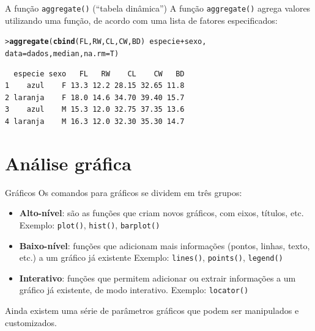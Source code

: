 \documentclass[10pt]{beamer}\usepackage{graphicx, color}
\makeatletter
\newcommand{\hlfunctioncall}[1]{\textcolor[rgb]{0,0,0.545098039215686}{\textbf{#1}}}%
\newenvironment{kframe}{%
 \def\at@end@of@kframe{}%
 \ifinner\ifhmode%
  \def\at@end@of@kframe{\end{minipage}}%
  \begin{minipage}{\columnwidth}%
 \fi\fi%
 \def\FrameCommand##1{\hskip\@totalleftmargin \hskip-\fboxsep
 \colorbox{shadecolor}{##1}\hskip-\fboxsep
     \hskip-\linewidth \hskip-\@totalleftmargin \hskip\columnwidth}%
 \MakeFramed {\advance\hsize-\width
   \@totalleftmargin\z@ \linewidth\hsize
   \@setminipage}}%
 {\par\unskip\endMakeFramed%
 \at@end@of@kframe}
\newenvironment{knitrout}{}{} %
\makeatother
\begin{document}
\begin{frame}[fragile=singleslide]{A função \texttt{aggregate()} (``tabela dinâmica'')}
A função \texttt{aggregate()} agrega valores utilizando uma função, de
acordo com uma lista de fatores especificados:
\begin{knitrout}\small
{}\color{fgcolor}\begin{kframe}
\begin{alltt}
> \hlfunctioncall{aggregate}(\hlfunctioncall{cbind}(FL, RW, CL, CW, BD) ~ especie + sexo,
            data = dados, median, na.rm=T)
\end{alltt}
\begin{verbatim}
  especie sexo   FL   RW    CL    CW   BD
1    azul    F 13.3 12.2 28.15 32.65 11.8
2 laranja    F 18.0 14.6 34.70 39.40 15.7
3    azul    M 15.3 12.0 32.75 37.35 13.6
4 laranja    M 16.3 12.0 32.30 35.30 14.7
\end{verbatim}
\end{kframe}
\end{knitrout}

\end{frame}

\section{Análise gráfica}

\begin{frame}[fragile=singleslide]{Gráficos}
Os comandos para gráficos se dividem em três grupos:
\begin{itemize}
\item \textbf{Alto-nível}: são as funções que criam novos gráficos, com
  eixos, títulos, etc. Exemplo: \texttt{plot()}, \texttt{hist()},
  \texttt{barplot()}
\item \textbf{Baixo-nível}: funções que adicionam mais informações
  (pontos, linhas, texto, etc.) a um gráfico já existente Exemplo:
  \texttt{lines()}, \texttt{points()}, \texttt{legend()}
\item \textbf{Interativo}: funções que permitem adicionar ou extrair
  informações a um gráfico já existente, de modo interativo. Exemplo:
  \texttt{locator()}
\end{itemize}
Ainda existem uma série de parâmetros gráficos que podem ser manipulados
e customizados.
\end{frame}
\end{document}

